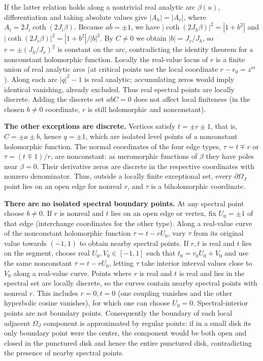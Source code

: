 \documentclass[11pt,a4paper]{article}
\numberwithin{equation}{section}
\theoremstyle{plain}
\theoremstyle{definition}
\begin{document}
If the latter relation holds along a nontrivial real analytic arc \(\beta(u)\), differentiation and taking absolute values give \(|A_h|=|A_v|\), where \(A_i=2J_i\coth(2J_i\beta)\). Because \(a\bar b=\pm1\), we have \(|\coth(2J_h\beta)|^2=|1+b^2|\) and \(|\coth(2J_v\beta)|^2=|1+b^2|/|b|^2\). By \(C\ne0\) we obtain \(|b|=J_v/J_h\), so \(r=\pm(J_h/J_v)^2\) is constant on the arc, contradicting the identity theorem for a nonconstant holomorphic function. Locally the real-value locus of \(r\) is a finite union of real analytic arcs (at critical points use the local coordinate \(r-r_0=z^m\)). Along each arc \(|q|^2-1\) is real analytic; accumulating zeros would imply identical vanishing, already excluded. Thus real spectral points are locally discrete. Adding the discrete set \(abC=0\) does not affect local finiteness (in the chosen \(b\ne0\) coordinate, \(r\) is still holomorphic and nonconstant).

\textbf{The other exceptions are discrete.} Vertices satisfy \(t=\pm r\pm1\), that is, \(C=\pm a\pm b\), hence \(q=\pm1\), which are isolated level points of a nonconstant holomorphic function. The normal coordinates of the four edge types, \(\tau=t\mp r\) or \(\tau=(t\mp1)/r\), are nonconstant: as meromorphic functions of \(\beta\) they have poles near \(\beta=0\). Their derivative zeros are discrete in the respective coordinates with nonzero denominator. Thus, outside a locally finite exceptional set, every \(\partial\Omega_J\) point lies on an open edge for nonreal \(r\), and \(\tau\) is a biholomorphic coordinate.

\textbf{There are no isolated spectral boundary points.} At any spectral point choose \(b\ne0\). If \(r\) is nonreal and \(t\) lies on an open edge or vertex, fix \(U_0=\pm1\) of that edge (interchange coordinates for the other type). Along a real-value curve of the nonconstant holomorphic function \(\tau=t-rU_0\), vary \(\tau\) from its original value towards \((-1,1)\) to obtain nearby spectral points. If \(r,t\) is real and \(t\) lies on the segment, choose real \(U_0,V_0\in[-1,1]\) such that \(t_0=r_0U_0+V_0\) and use the same nonconstant \(\tau=t-rU_0\), letting \(\tau\) take interior interval values close to \(V_0\) along a real-value curve. Points where \(r\) is real and \(t\) is real and lies in the spectral set are locally discrete, so the curves contain nearby spectral points with nonreal \(r\). This includes \(r=0,t=0\) (one coupling vanishes and the other hyperbolic cosine vanishes), for which one can choose \(U_0=0\). Spectral-interior points are not boundary points. Consequently the boundary of each local adjacent \(\Omega_J\) component is approximated by regular points: if in a small disk its only boundary point were the center, the component would be both open and closed in the punctured disk and hence the entire punctured disk, contradicting the presence of nearby spectral points.
\end{document}
